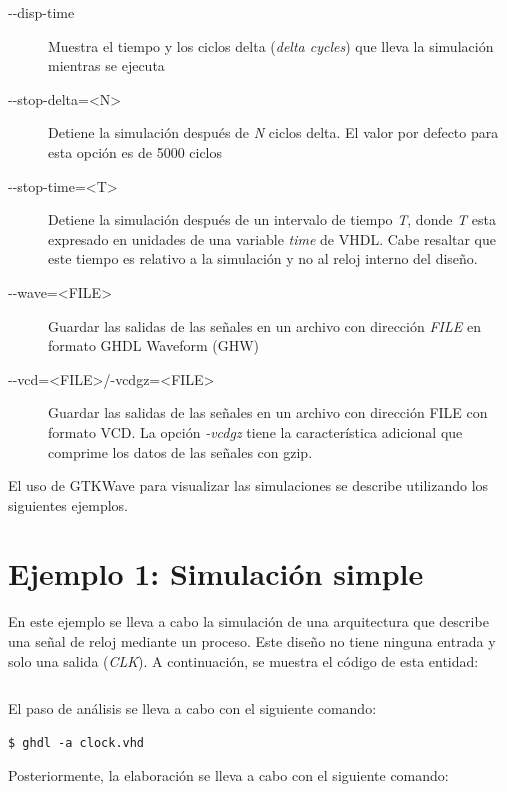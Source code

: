 \documentclass[11pt]{article}
\begin{document}
\begin{description} 
\item[-{}-disp-time] Muestra el tiempo y los ciclos delta 
    (\textit{delta cycles}) que lleva la simulación mientras se ejecuta

\item[-{}-stop-delta=<N>] Detiene la simulación después de \textit{N} ciclos
    delta. El valor por defecto para esta opción es de 5000 ciclos

\item[-{}-stop-time=<T>] Detiene la simulación después de un intervalo de
    tiempo \textit{T}, donde \textit{T} esta expresado en unidades de una variable 
    \textit{time} de VHDL. Cabe resaltar que este tiempo es relativo a la simulación 
    y no al reloj interno del diseño.

\item[-{}-wave=<FILE>] Guardar las salidas de las señales en un archivo
    con dirección \textit{FILE} en formato GHDL Waveform (GHW)

\item[-{}-vcd=<FILE>/-vcdgz=<FILE>] Guardar las salidas de las señales en
    un archivo con dirección FILE con formato VCD. La opción \textit{-vcdgz} tiene
    la característica adicional que comprime los datos de las señales con gzip. 
\end{description} 

El uso de GTKWave para visualizar las simulaciones se describe utilizando los
siguientes ejemplos.

\section{Ejemplo 1: Simulación simple}

En este ejemplo se lleva a cabo la simulación de una arquitectura que
describe una señal de reloj mediante un proceso. Este diseño no tiene
ninguna entrada y solo una salida (\textit{CLK}). A continuación, se muestra el
código de esta entidad:

\inputminted[frame=single, framesep=4mm, label=\fbox{clock.vhd},
labelposition=bottomline]{vhdl}{src/clock.vhd}

El paso de análisis se lleva a cabo con el siguiente comando:

\begin{Verbatim}[frame=single]
$ ghdl -a clock.vhd
\end{Verbatim}

Posteriormente, la elaboración se lleva a cabo con el siguiente comando:
\end{document}
